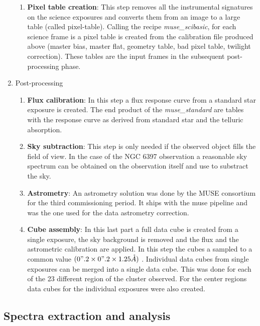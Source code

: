 \begin{enumerate}
\begin{enumerate}[I]
    \item{\textbf{Pixel table creation}}: This step removes all the instrumental signatures on the science exposures and converts them from an image to a large table (called pixel-table). Calling the recipe \emph{muse\_scibasic}, for each science frame is a pixel table is created from the calibration file produced above (master bias, master flat, geometry table, bad pixel table, twilight correction). These tables are the input frames in the subsequent post-processing phase.
    \end{enumerate}
    
\item Post-processing
                \begin{enumerate}[I]
			\item \textbf{Flux calibration}:  In this step a flux response curve from a standard star exposure is created. The end product of the \emph{muse\_standard} are tables with the response curve as derived from standard star and the telluric absorption.
                        \item \textbf{Sky subtraction}: This step is only needed if the observed object fills the field of view. In the case of the NGC 6397 observation a reasonable sky spectrum can be obtained on the observation itself and use to substract the sky.   
                        \item \textbf{Astrometry}: An astrometry solution was done by the MUSE consortium for the third commissioning period. It ships with the muse pipeline and was the one used for the data astrometry correction.  
          
			\item \textbf{Cube assembly}: In this last part a full data cube is created from a single exposure, the sky background is removed and the flux and the astrometric calibration are applied. In this step the cubes a sampled to a common value $(0".2 \times 0".2 \times 1.25 \mathring{A})$ . Individual data cubes from single exposures can be merged into a single data cube. This was done for each of the 23 different region of the cluster observed. For the center regions data cubes for the individual exposures were also created.  
                \end{enumerate}
\end{enumerate}


\subsection{Spectra extraction and analysis}


